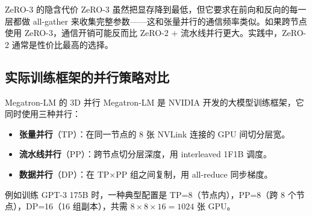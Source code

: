 \begin{warningbox}{ZeRO-3 的隐含代价}
ZeRO-3 虽然把显存降到最低，但它要求在前向和反向的每一层都做 all-gather 来收集完整参数——这和张量并行的通信频率类似。如果跨节点使用 ZeRO-3，通信开销可能反而比 ZeRO-2 + 流水线并行更大。实践中，ZeRO-2 通常是性价比最高的选择。
\end{warningbox}

\subsection{实际训练框架的并行策略对比}

\begin{table}[H]
\centering
\small
{}
\caption{主流分布式训练框架对比}
\end{table}

\begin{knowledgebox}{Megatron-LM 的 3D 并行}
Megatron-LM 是 NVIDIA 开发的大模型训练框架，它同时使用三种并行：
\begin{itemize}
    \item \textbf{张量并行}（TP）：在同一节点的 8 张 NVLink 连接的 GPU 间切分层宽。
    \item \textbf{流水线并行}（PP）：跨节点切分层深度，用 interleaved 1F1B 调度。
    \item \textbf{数据并行}（DP）：在 TP$\times$PP 组之间复制，用 all-reduce 同步梯度。
\end{itemize}
例如训练 GPT-3 175B 时，一种典型配置是 TP=8（节点内），PP=8（跨 8 个节点），DP=16（16 组副本），共需 $8 \times 8 \times 16 = 1024$ 张 GPU。
\end{knowledgebox}

